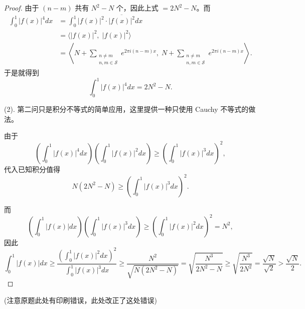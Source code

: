 \documentclass[12pt]{ctexart}  %
\begin{document}
\begin{proof}
由于 $(n-m)$ 共有 $N^2-N$ 个，因此上式 $=2N^2-N$。而
\begin{align*}
\int_0^1 |f(x)|^4 dx 
&= \int_0^1 |f(x)|^2 \cdot \overline{|f(x)|^2} dx\\
&= \langle |f(x)|^2,\;|f(x)|^2\rangle\\
&= \left\langle N+\sum_{\substack{n\neq m\\n,m\in\mathcal{S}}}e^{2\pi i(n-m)x},\;N+\sum_{\substack{n\neq m\\n,m\in\mathcal{S}}}e^{2\pi i(n-m)x}\right\rangle.
\end{align*}
于是就得到
\[
\int_0^1 |f(x)|^4 dx = 2N^2-N.
\]

(2). 第二问只是积分不等式的简单应用，这里提供一种只使用 Cauchy 不等式的做法。

由于
\[
\left(\int_0^1 |f(x)|^4 dx\right)\left(\int_0^1 |f(x)|^2 dx\right) \ge \left(\int_0^1 |f(x)|^3 dx\right)^2,
\]
代入已知积分值得
\[
N\left(2N^2-N\right) \ge \left(\int_0^1 |f(x)|^3 dx\right)^2.
\]

而
\[
\left(\int_0^1 |f(x)| dx\right)\left(\int_0^1 |f(x)|^3 dx\right) \ge \left(\int_0^1 |f(x)|^2 dx\right)^2 = N^2,
\]
因此
\[
\int_0^1 |f(x)| dx \ge \frac{\left(\int_0^1 |f(x)|^2 dx\right)^2}{\int_0^1 |f(x)|^3 dx}
\ge \frac{N^2}{\sqrt{N(2N^2-N)}}
= \sqrt{\frac{N^3}{2N^2-N}}
\ge \sqrt{\frac{N^3}{2N^2}}
= \frac{\sqrt{N}}{\sqrt{2}} > \frac{\sqrt{N}}{2}.
\]

\end{proof}
(注意原题此处有印刷错误，此处改正了这处错误)
\end{document}
